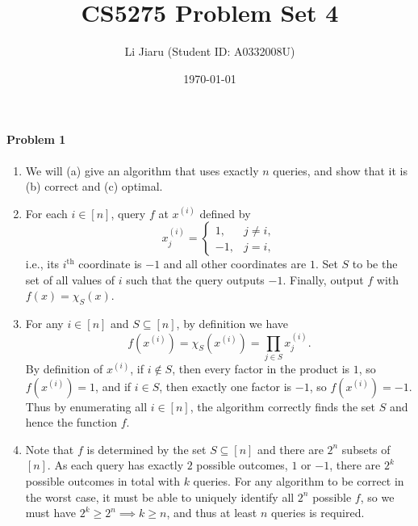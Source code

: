 \documentclass[12pt]{article}
\title{CS5275 Problem Set 4}
\author{Li Jiaru (Student ID: A0332008U)}
\date{\today}
\begin{document}
\maketitle
\paragraph{Problem 1}
\begin{enumerate}[label=\alph*., font=\bfseries]
\item[] We will (a) give an algorithm that uses exactly $n$ queries, and show that it is (b) correct and (c) optimal.
\item For each $i\in[n]$, query $f$ at $x^{(i)}$ defined by $$x^{(i)}_j=\begin{cases}
1,&j\ne i,\\-1,&j=i,\end{cases}$$ i.e., its $i^{\text{th}}$ coordinate is $-1$ and all other coordinates are $1$. Set $S$ to be the set of all values of $i$ such that the query outputs $-1$. Finally, output $f$ with $f(x)=\chi_S(x)$.
\item For any $i\in[n]$ and $S\subseteq [n]$, by definition we have $$f\left(x^{(i)}\right)=\chi_S\left(x^{(i)}\right)=\prod_{j\in S}x^{(i)}_j.$$ By definition of $x^{(i)}$, if $i\not\in S$, then every factor in the product is $1$, so $f\left(x^{(i)}\right)=1$, and if $i\in S$, then exactly one factor is $-1$, so $f\left(x^{(i)}\right)=-1$. Thus by enumerating all $i\in[n]$, the algorithm correctly finds the set $S$ and hence the function $f$.
\item Note that $f$ is determined by the set $S\subseteq [n]$ and there are $2^n$ subsets of $[n]$. As each query has exactly $2$ possible outcomes, $1$ or $-1$, there are $2^k$ possible outcomes in total with $k$ queries. For any algorithm to be correct in the worst case, it must be able to uniquely identify all $2^n$ possible $f$, so we must have $2^k\ge 2^n\implies k\ge n$, and thus at least $n$ queries is required.
\end{enumerate}
\newpage
\end{document}
